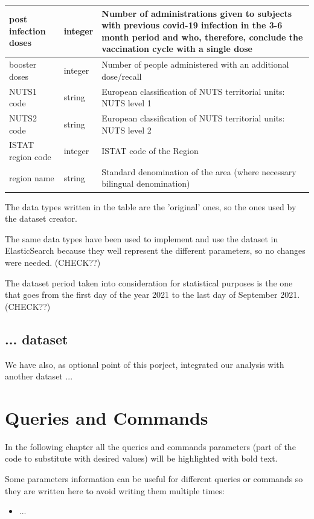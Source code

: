 \documentclass{article}
\begin{document}
\newpage
\begin{center}
\begin{tabular}{ |m{4cm}|m{2cm}|m{4.5cm}|}
\hline
  post infection doses & integer & Number of administrations given to subjects with previous covid-19 infection in the 3-6 month period and who, therefore, conclude the vaccination cycle with a single dose\\ 
    \hline
  booster doses & integer & Number of people administered with an additional dose/recall\\ 
    \hline
  NUTS1 code & string & European classification of NUTS territorial units: NUTS level 1\\ 
    \hline
  NUTS2 code & string & European classification of NUTS territorial units: NUTS level 2\\ 
    \hline
  ISTAT region code & integer & ISTAT code of the Region\\
    \hline
  region name & string & Standard denomination of the area (where necessary bilingual denomination)\\ 
  \hline
  \end{tabular}
\end{center}
\hfill\break
The data types written in the table are the 'original' ones, so the ones used by the dataset creator. 

The same data types have been used to implement and use the dataset in ElasticSearch because they well represent the different parameters, so no changes were needed. (CHECK??)

The dataset period taken into consideration for statistical purposes is the one that goes from the first day of the year 2021 to the last day of September 2021. (CHECK??)

\newpage
\subsection{... dataset}
We have also, as optional point of this porject, integrated our analysis with another dataset ...

\newpage
\section{Queries and Commands}
In the following chapter all the queries and commands parameters (part of the code to substitute with desired values) will be highlighted with \textbf{\color{magenta}{magenta}} bold text.

Some parameters information can be useful for different queries or commands so they are written here to avoid writing them multiple times:
\begin{itemize}
    \item ...
\end{itemize}
\end{document}
